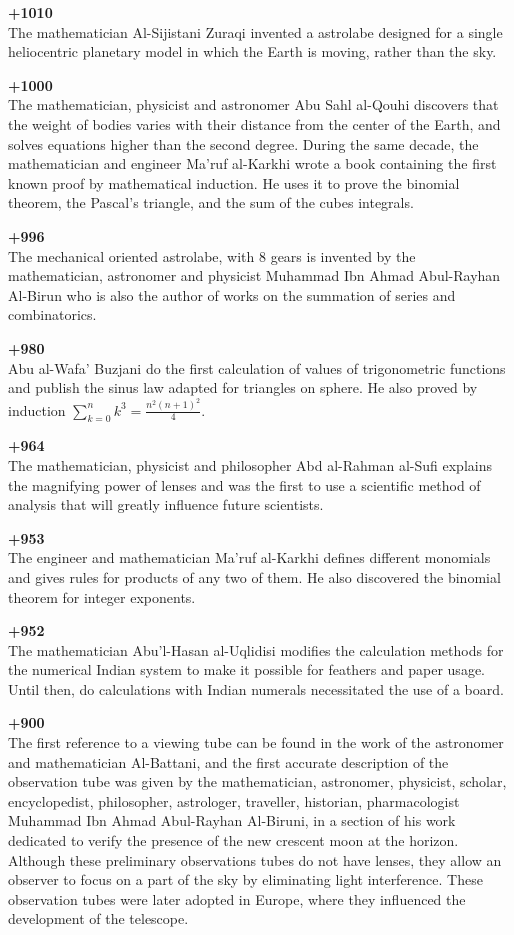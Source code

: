 \textbf{+1010}\\
The mathematician Al-Sijistani Zuraqi invented a astrolabe designed for a single heliocentric planetary model in which the Earth is moving, rather than the sky.

\textbf{+1000}\\
The mathematician, physicist and astronomer Abu Sahl al-Qouhi discovers that the weight of bodies varies with their distance from the center of the Earth, and solves equations higher than the second degree. During the same decade, the mathematician and engineer Ma'ruf al-Karkhi wrote a book containing the first known proof by mathematical induction. He uses it to prove the binomial theorem, the Pascal's triangle, and the sum of the cubes integrals.

\textbf{+996}\\
The mechanical oriented astrolabe, with 8 gears is invented by the mathematician, astronomer and physicist Muhammad Ibn Ahmad Abul-Rayhan Al-Birun who is also the author of works on the summation of series and combinatorics.

\textbf{+980}\\
Abu al-Wafa' Buzjani do the first calculation of values of trigonometric functions and publish the sinus law adapted for triangles on sphere. He also proved by induction $\sum_{k=0}^n k^3=\frac{n^2(n+1)^2}{4}$.

\textbf{+964}\\
The mathematician, physicist and philosopher Abd al-Rahman al-Sufi explains the magnifying power of lenses and was the first to use a scientific method of analysis that will greatly influence future scientists.

\textbf{+953}\\
The engineer and mathematician Ma'ruf al-Karkhi defines different monomials and gives rules for products of any two of them. He also discovered the binomial theorem for integer exponents.

\textbf{+952}\\
The mathematician Abu'l-Hasan al-Uqlidisi modifies the calculation methods for the numerical Indian system to make it possible for feathers and paper usage. Until then, do calculations with Indian numerals necessitated the use of a board.

\textbf{+900}\\
The first reference to a viewing tube can be found in the work of the astronomer and mathematician Al-Battani, and the first accurate description of the observation tube was given by the mathematician, astronomer, physicist, scholar, encyclopedist, philosopher, astrologer, traveller, historian, pharmacologist Muhammad Ibn Ahmad Abul-Rayhan Al-Biruni, in a section of his work dedicated to verify the presence of the new crescent moon at the horizon. Although these preliminary observations tubes do not have lenses, they allow an observer to focus on a part of the sky by eliminating light interference. These observation tubes were later adopted in Europe, where they influenced the development of the telescope.

